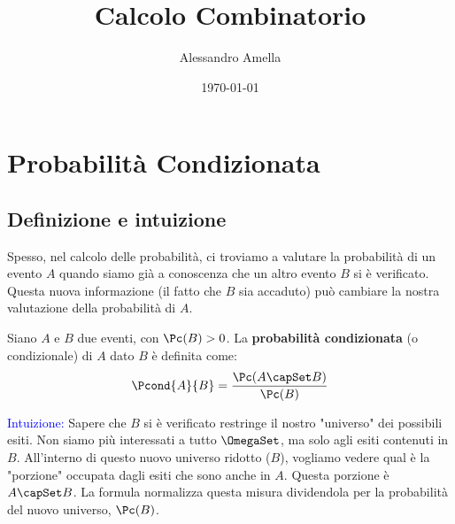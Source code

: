 

\title{Calcolo Combinatorio}
\author{Alessandro Amella}
\date{\today}



\maketitle
\tableofcontents
\newpage

\section{Probabilità Condizionata}

\subsection{Definizione e intuizione}

Spesso, nel calcolo delle probabilità, ci troviamo a valutare la probabilità di un evento $A$ quando siamo già a conoscenza che un altro evento $B$ si è verificato. Questa nuova informazione (il fatto che $B$ sia accaduto) può cambiare la nostra valutazione della probabilità di $A$.

\begin{definition}
Siano $A$ e $B$ due eventi, con $\Pc(B) > 0$. La \textbf{probabilità condizionata} (o condizionale) di $A$ dato $B$ è definita come:
\[ \Pcond{A}{B} = \frac{\Pc(A \capSet B)}{\Pc(B)} \]
\end{definition}

\textcolor{blue}{Intuizione:} Sapere che $B$ si è verificato restringe il nostro "universo" dei possibili esiti. Non siamo più interessati a tutto $\OmegaSet$, ma solo agli esiti contenuti in $B$. All'interno di questo nuovo universo ridotto ($B$), vogliamo vedere qual è la "porzione" occupata dagli esiti che sono anche in $A$. Questa porzione è $A \capSet B$. La formula normalizza questa misura dividendola per la probabilità del nuovo universo, $\Pc(B)$.

